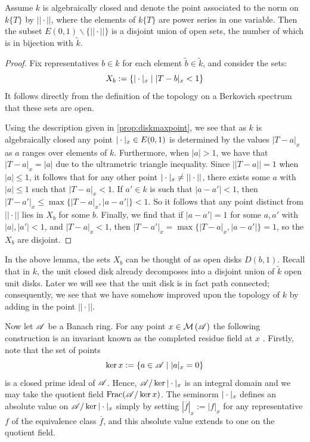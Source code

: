 \begin{lemma}\label{diskstructure}
    Assume $k$ is algebraically closed and denote the point associated to the norm on $k\{T\}$ by $||\cdot||$, where the elements of $k\{T\}$ are power series in one variable. Then the subset $E(0, 1) \backslash \{ ||\cdot|| \}$ is a disjoint union of open sets, the number of which is in bijection with $\tilde k$.
\end{lemma}
\begin{proof}
    Fix representatives $b \in k$ for each element $\tilde{b} \in \tilde{k}$, and consider the sets:
    \[
    X_{b} := \{ |\cdot|_x \; | \; |T - b|_x < 1 \}
    \]
    It follows directly from the definition of the topology on a Berkovich spectrum that these sets are open. 
    
    Using the description given in \cref{prop:diskmaxpoint}, we see that as $k$ is algebraically closed any point $|\cdot|_x \in E(0, 1)$ is determined by the values $|T - a|_x$ as $a$ ranges over elements of $k$.
    Furthermore, when $|a| > 1$, we have that $|T - a|_x = |a|$ due to the ultrametric triangle inequality.
    Since $||T - a|| = 1$ when $|a| \leq 1$, it follows that for any other point $|\cdot|_x \neq ||\cdot||$, there exists some $a$ with $|a| \leq 1$ such that $|T - a|_x < 1$. 
    If $a' \in k$ is such that $|a - a'| < 1$, then $|T - a'|_x \leq \max \{|T - a|_x, |a - a'| \} < 1$. 
    So it follows that any point distinct from $||\cdot||$ lies in $X_b$ for some $b$. 
    Finally, we find that if $|a - a'| = 1$ for some $a, a'$ with $|a|, |a'| < 1$, and $|T - a|_x < 1$, then $|T - a'|_x = \max \{ |T - a|_x, |a - a'|\} = 1$, so the $X_b$ are disjoint.
\end{proof}

In the above lemma, the sets $X_b$ can be thought of as open disks $D(b, 1)$. Recall that in $k$, the unit closed disk already decomposes into a disjoint union of $\tilde k$ open unit disks. Later we will see that the unit disk is in fact path connected; consequently, we see that we have somehow improved upon the topology of $k$ by adding in the point $||\cdot||$.

Now let $\mathscr{A}$ be a Banach ring. For any point $x \in \mathcal{M}\left(\mathscr{A}\right)$ the following construction is an invariant known as the completed residue field at $x$ \parencite[\S 1.2.2]{berk1}.
Firstly, note that the set of points 
\[\ker x := \{a \in \mathscr{A} \; \vert \; |a|_x = 0 \}\]
is a closed prime ideal of $\mathscr{A}$. Hence, $\mathscr{A}/\ker |\cdot|_x$ is an integral domain and we may take the quotient field $\operatorname{Frac}(\mathscr{A}/\ker x)$. The seminorm $|\cdot|_x$ defines an absolute value on $\mathscr{A}/\ker |\cdot|_x$ simply by setting $|\overline f|_x := |f|_x$ for any representative $f$ of the equivalence class $\overline f$, and this absolute value extends to one on the quotient field. 

